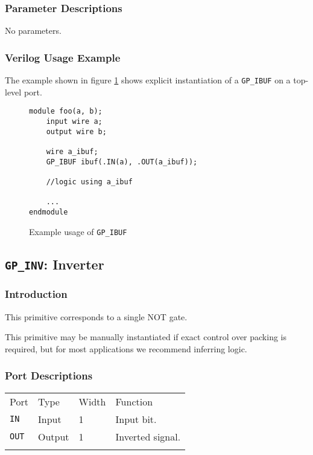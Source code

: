 \documentclass[11pt]{article}
\newcommand{\tokenstyle}[1]{\texttt{#1}}
\newcommand{\whenstyle}[1]{{\fontseries{sb}\selectfont#1}}
\newcommand{\thinhline}{\Xhline{1\arrayrulewidth}}
\newcommand{\thickhline}{\Xhline{2.5\arrayrulewidth}}
\begin{document}
\subsubsection{Parameter Descriptions}

No parameters.

\subsubsection{Verilog Usage Example}

The example shown in figure \ref{gp-ibuf-example} shows explicit instantiation of a \tokenstyle{GP\_IBUF} on a top-level port.

\begin{figure}[h]
\begin{lstlisting}
module foo(a, b);
	input wire a;
	output wire b;

	wire a_ibuf;
	GP_IBUF ibuf(.IN(a), .OUT(a_ibuf));

	//logic using a_ibuf

	...
endmodule
\end{lstlisting}
\caption{Example usage of \tokenstyle{GP\_IBUF}}
\label{gp-ibuf-example}
\end{figure}


\pagebreak
\subsection{\tokenstyle{GP\_INV}: Inverter}
\label{gp-inv}

\subsubsection{Introduction}
This primitive corresponds to a single NOT gate.

This primitive may be manually instantiated if exact control over packing is required, but for most applications we
recommend inferring logic.

\subsubsection{Port Descriptions}

\begin{tabularx}{\textwidth}{lllX}
\thinhline
\whenstyle{Port} & \whenstyle{Type} & \whenstyle{Width} & \whenstyle{Function} \\
\thickhline
\tokenstyle{IN} & Input & 1 & Input bit. \\
\thinhline
\tokenstyle{OUT} & Output & 1 & Inverted signal. \\
\thinhline
\end{tabularx}
\end{document}
